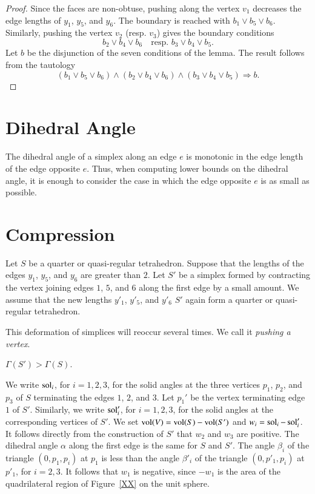 \begin{proof} Since the faces are non-obtuse, pushing along the
vertex $v_1$ decreases the edge lengths of $y_1$, $y_5$, and
$y_6$.  The boundary is reached with $b_1\lor b_5\lor b_6$.
Similarly, pushing the vertex $v_2$ (resp. $v_3$) gives the
boundary conditions
    $$b_2\lor b_4 \lor b_6 \quad \text{resp. } b_3\lor b_4\lor
    b_5.$$
Let $b$ be the disjunction of the seven conditions of the lemma.
The result follows from the tautology
    $$
    (b_1\lor b_5\lor b_6)\land (b_2\lor b_4 \lor b_6)\land (b_3\lor b_4\lor
    b_5) \Rightarrow b.
    $$
\end{proof}

\section{Dihedral Angle}\label{sec:reduction:dih}

The dihedral angle of a simplex along an edge $e$ is monotonic in
the edge length of the edge opposite $e$.  Thus, when computing
lower bounds on the dihedral angle, it is enough to consider the
case in which the edge opposite $e$ is as small as possible.

\section{Compression}\label{sec:reduction:grad}

Let $S$ be a quarter or quasi-regular tetrahedron. Suppose that
the lengths of the edges $y_1$, $y_5$, and $y_6$ are greater than
$2$. Let $S'$ be a simplex formed by contracting the vertex
joining edges $1$, $5$, and $6$ along the first edge by a small
amount. We assume that the new lengths  $y'_1$, $y'_5$, and $y'_6$
$S'$ again form a quarter or quasi-regular tetrahedron.

\begin{remark}  This deformation of simplices will reoccur several
times.  We call it {\it pushing a vertex}.
\end{remark}

\begin{lemma}  $\Gamma(S') > \Gamma(S)$.
\end{lemma}

We write $\operatorname{sol}_i$, for $i=1,2,3$, for the solid angles at the
three vertices $p_1$, $p_2$, and $p_3$ of $S$ terminating the
edges $1$, $2$, and $3$. Let $p_1'$ be the vertex terminating edge
$1$ of $S'$. Similarly, we write $\operatorname{sol}'_i$, for $i=1,2,3$, for the
solid angles at the corresponding vertices of $S'$.  We set
${\operatorname{vol}}(V) = {\operatorname{vol}}(S)-{\operatorname{vol}}(S')$ and $w_i =
\operatorname{sol}_i-\operatorname{sol}'_i$. It follows directly from the construction of $S'$
that $w_2$ and $w_3$ are positive. The dihedral angle $\alpha$
along the first edge is the same for $S$ and $S'$. The angle
$\beta_i$ of the triangle $(0,p_1,p_i)$ at $p_1$ is less than the
angle $\beta'_i$ of the triangle $(0,p'_1,p_i)$ at $p'_1$, for
$i=2,3$.  It follows that $w_1$ is negative, since $-w_1$ is the
area of the quadrilateral region of Figure~\ref{XX} on the unit
sphere.


